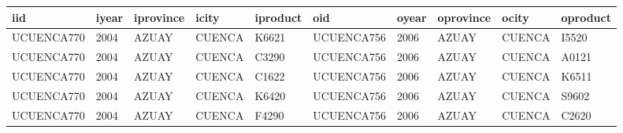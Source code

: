 \begin{tabular}{llllllllll}
\toprule
       iid & iyear & iprovince &  icity & iproduct &        oid & oyear & oprovince &  ocity & oproduct \\
\midrule
UCUENCA770 &  2004 &     AZUAY & CUENCA &    K6621 & UCUENCA756 &  2006 &     AZUAY & CUENCA &    I5520 \\
UCUENCA770 &  2004 &     AZUAY & CUENCA &    C3290 & UCUENCA756 &  2006 &     AZUAY & CUENCA &    A0121 \\
UCUENCA770 &  2004 &     AZUAY & CUENCA &    C1622 & UCUENCA756 &  2006 &     AZUAY & CUENCA &    K6511 \\
UCUENCA770 &  2004 &     AZUAY & CUENCA &    K6420 & UCUENCA756 &  2006 &     AZUAY & CUENCA &    S9602 \\
UCUENCA770 &  2004 &     AZUAY & CUENCA &    F4290 & UCUENCA756 &  2006 &     AZUAY & CUENCA &    C2620 \\
\bottomrule
\end{tabular}
